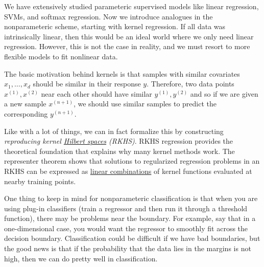 We have extensively studied parameteric supervised models like linear regression, SVMs, and softmax regression. Now we introduce analogues in the nonparameteric scheme, starting with kernel regression. If all data was intrinsically linear, then this would be an ideal world where we only need linear regression. However, this is not the case in reality, and we must resort to more flexible models to fit nonlinear data. 

The basic motivation behind kernels is that samples with similar covariates $x_1, \ldots, x_d$ should be similar in their response $y$. Therefore, two data points $x^{(1)}, x^{(2)}$ near each other should have similar $y^{(1)}, y^{(2)}$ and so if we are given a new sample $x^{(n+1)}$, we should use similar samples to predict the corresponding $y^{(n+1)}$. 

Like with a lot of things, we can in fact formalize this by constructing \textit{reproducing kernel \hyperref[fa-def:hilbert-space]{Hilbert spaces} (RKHS)}. RKHS regression provides the theoretical foundation that explains why many kernel methods work. The representer theorem shows that solutions to regularized regression problems in an RKHS can be expressed as \hyperref[lin-def:linear-combination]{linear combinations} of kernel functions evaluated at nearby training points. 

One thing to keep in mind for nonparameteric classification is that when you are using plug-in classifiers (train a regressor and then run it through a threshold function), there may be problems near the boundary. For example, say that in a one-dimensional case, you would want the regressor to smoothly fit across the decision boundary. Classification could be difficult if we have bad boundaries, but the good news is that if the probability that the data lies in the margins is not high, then we can do pretty well in classification. 

